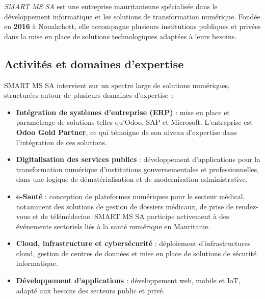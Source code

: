 ﻿\documentclass[12pt,a4paper]{report}
\begin{document}
\textit{SMART MS SA} est une entreprise mauritanienne spécialisée dans
le développement informatique et les solutions de transformation
numérique. Fondée en \textbf{2016} à Nouakchott, elle accompagne plusieurs institutions
publiques et privées dans la mise en place de solutions technologiques
adaptées à leurs besoins.


\subsection{Activités et domaines d'expertise}

SMART MS SA intervient sur un spectre large de solutions numériques,
structurées autour de plusieurs domaines d'expertise~:

\begin{itemize}
    \item \textbf{Intégration de systèmes d'entreprise (ERP)} : mise en
    place et paramétrage de solutions telles qu'Odoo, SAP et Microsoft.
    L'entreprise est \textbf{Odoo Gold Partner}, ce qui témoigne de son
    niveau d'expertise dans l'intégration de ces solutions.

    \item \textbf{Digitalisation des services publics} : développement
    d'applications pour la transformation numérique d'institutions
    gouvernementales et professionnelles, dans une logique de
    dématérialisation et de modernisation administrative.

    \item \textbf{e-Santé} : conception de plateformes numériques pour
    le secteur médical, notamment des solutions de gestion de dossiers
    médicaux, de prise de rendez-vous et de télémédecine. SMART MS SA
    participe activement à des événements sectoriels liés à la santé
    numérique en Mauritanie.

    \item \textbf{Cloud, infrastructure et cybersécurité} : déploiement
    d'infrastructures cloud, gestion de centres de données et mise en
    place de solutions de sécurité informatique.

    \item \textbf{Développement d'applications} : développement web,
    mobile et IoT, adapté aux besoins des secteurs public et privé.
\end{itemize}
\end{document}

